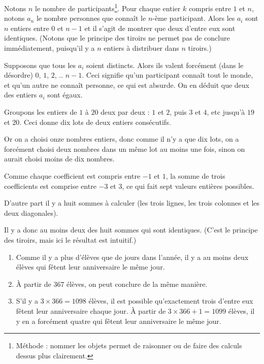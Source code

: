 \begin{Soln}{8}
Notons $n$ le nombre de participants\footnote{Méthode : nommer les objets permet de raisonner ou de faire des calculs dessus plus clairement.}. Pour chaque entier $k$ compris entre $1$ et $n$, notons $a_n$ le nombre personnes que connaît le $n$-ème participant. Alors les $a_i$ sont $n$ entiers entre $0$ et $n-1$ et il s'agit de montrer que deux d'entre eux sont identiques. (Notons que le principe des tiroirs ne permet pas de conclure immédiatement, puisqu'il y a $n$ entiers à distribuer dans $n$ tiroirs.)

Supposons que tous les $a_i$ soient distincts. Alors ils valent forcément (dans le désordre) $0$, $1$, $2$, .. $n-1$. Ceci signifie qu'un participant connaît tout le monde, et qu'un autre ne connaît personne, ce qui est absurde. On en déduit que deux des entiers $a_i$ sont égaux.
\end{Soln}
\begin{Soln}{9}
Groupons les entiers de $1$ à $20$ deux par deux : $1$ et $2$, puis $3$ et $4$, etc jusqu'à $19$ et $20$. Ceci donne dix \og lots\fg{} de deux entiers consécutifs.

Or on a choisi onze nombres entiers, donc comme il n'y a que dix lots, on a forcément choisi deux nombres dans un même lot au moins une fois, sinon on aurait choisi moins de dix nombres.
\end{Soln}
\begin{Soln}{10}
Comme chaque coefficient est compris entre $-1$ et $1$, la somme de trois coefficients est comprise entre $-3$ et $3$, ce qui fait sept valeurs entières possibles.

D'autre part il y a huit sommes à calculer (les trois lignes, les trois colonnes et les deux diagonales).

Il y a donc au moins deux des huit sommes qui sont identiques. (C'est le principe des tiroirs, mais ici le résultat est intuitif.)
\end{Soln}
\begin{Soln}{11}
\begin{enumerate}
\item
Comme il y a plus d'élèves que de jours dans l'année, il y a au moins deux élèves qui fêtent leur anniversaire le même jour.

\item À partir de $367$ élèves, on peut conclure de la même manière.

\item S'il y a $3\times 366=1098$ élèves, il est possible qu'exactement trois d'entre eux fêtent leur anniversaire chaque jour. À partir de $3\times 366+1=1099$ élèves, il y en a forcément quatre qui fêtent leur anniversaire le même jour.
\end{enumerate}
\end{Soln}
